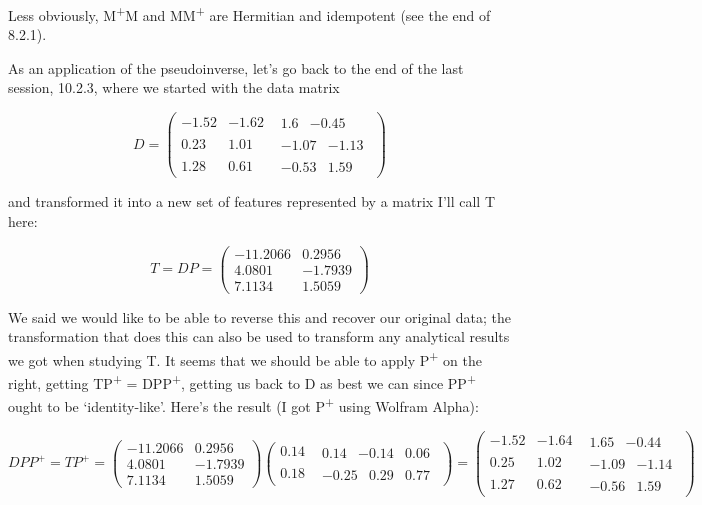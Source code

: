 \documentclass[oneside,english]{amsbook}
\numberwithin{section}{chapter}
\theoremstyle{plain}
\theoremstyle{definition}
\begin{document}
Less obviously, M\textsuperscript{+}M and MM\textsuperscript{+} are
Hermitian and idempotent (see the end of 8.2.1).

As an application of the pseudoinverse, let's go back to the end of the
last session, 10.2.3, where we started with the data matrix

\[D = \begin{pmatrix}
	- 1.52 & - 1.62 & \begin{matrix}
		1.6 & - 0.45
	\end{matrix} \\
	0.23 & 1.01 & \begin{matrix}
		- 1.07 & - 1.13
	\end{matrix} \\
	1.28 & 0.61 & \begin{matrix}
		- 0.53 & 1.59
	\end{matrix}
\end{pmatrix}\]

and transformed it into a new set of features represented by a matrix
I'll call T here:

\[{T = DP
}{= \begin{pmatrix}
		- 11.2066 & 0.2956 \\
		4.0801 & - 1.7939 \\
		7.1134 & 1.5059
\end{pmatrix}}\]

We said we would like to be able to reverse this and recover our
original data; the transformation that does this can also be used to
transform any analytical results we got when studying T. It seems that
we should be able to apply P\textsuperscript{+} on the right, getting
TP\textsuperscript{+} = DPP\textsuperscript{+}, getting us back to D as
best we can since PP\textsuperscript{+} ought to be `identity-like'.
Here's the result (I got P\textsuperscript{+} using Wolfram Alpha):

\[{DPP^{+} = TP^{+}
}{= \begin{pmatrix}
		- 11.2066 & 0.2956 \\
		4.0801 & - 1.7939 \\
		7.1134 & 1.5059
	\end{pmatrix}\begin{pmatrix}
		0.14 & \begin{matrix}
			0.14 & - 0.14 & 0.06
		\end{matrix} \\
		0.18 & \begin{matrix}
			- 0.25 & 0.29 & 0.77
		\end{matrix}
	\end{pmatrix}
}{= \begin{pmatrix}
		- 1.52 & - 1.64 & \begin{matrix}
			1.65 & - 0.44
		\end{matrix} \\
		0.25 & 1.02 & \begin{matrix}
			- 1.09 & - 1.14
		\end{matrix} \\
		1.27 & 0.62 & \begin{matrix}
			- 0.56 & 1.59
		\end{matrix}
\end{pmatrix}}\]
\end{document}
